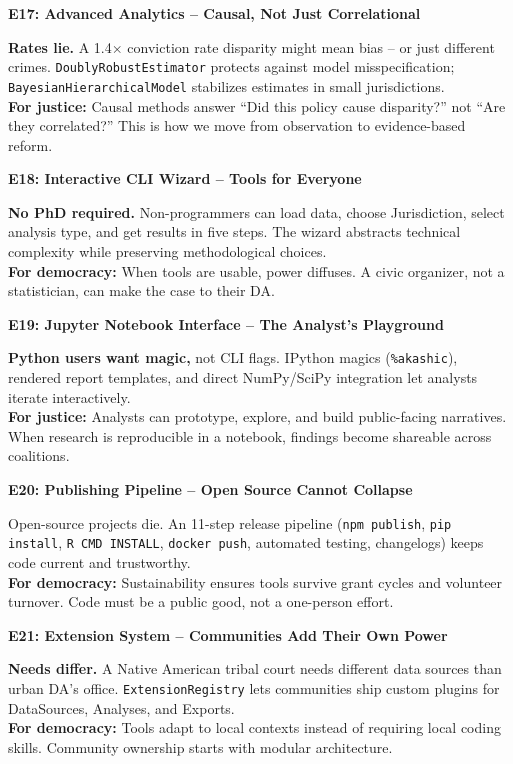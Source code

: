 \documentclass[11pt]{article}
\newcommand{\slide}[1]{\vspace{0.4em}\noindent\textbf{#1}\vspace{0.2em}}
\begin{document}
\slide{E17: Advanced Analytics -- Causal, Not Just Correlational}

\textbf{Rates lie.}  A 1.4$\times$ conviction rate disparity might mean bias -- or just different crimes.  \texttt{DoublyRobustEstimator} protects against model misspecification; \texttt{BayesianHierarchicalModel} stabilizes estimates in small jurisdictions.  \\
\textbf{For justice:} Causal methods answer ``Did this policy cause disparity?'' not ``Are they correlated?''  This is how we move from observation to evidence-based reform.

\slide{E18: Interactive CLI Wizard -- Tools for Everyone}

\textbf{No PhD required.}  Non-programmers can load data, choose Jurisdiction, select analysis type, and get results in five steps.  The wizard abstracts technical complexity while preserving methodological choices.  \\
\textbf{For democracy:} When tools are usable, power diffuses.  A civic organizer, not a statistician, can make the case to their DA.

\slide{E19: Jupyter Notebook Interface -- The Analyst's Playground}

\textbf{Python users want magic,} not CLI flags.  IPython magics (\texttt{\%akashic}), rendered report templates, and direct NumPy/SciPy integration let analysts iterate interactively.  \\
\textbf{For justice:} Analysts can prototype, explore, and build public-facing narratives.  When research is reproducible in a notebook, findings become shareable across coalitions.

\slide{E20: Publishing Pipeline -- Open Source Cannot Collapse}

Open-source projects die.  An 11-step release pipeline (\texttt{npm publish}, \texttt{pip install}, \texttt{R CMD INSTALL}, \texttt{docker push}, automated testing, changelogs) keeps code current and trustworthy.  \\
\textbf{For democracy:} Sustainability ensures tools survive grant cycles and volunteer turnover.  Code must be a public good, not a one-person effort.

\slide{E21: Extension System -- Communities Add Their Own Power}

\textbf{Needs differ.}  A Native American tribal court needs different data sources than urban DA's office.  \texttt{ExtensionRegistry} lets communities ship custom plugins for DataSources, Analyses, and Exports.  \\
\textbf{For democracy:} Tools adapt to local contexts instead of requiring local coding skills.  Community ownership starts with modular architecture.
\end{document}
